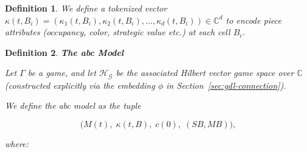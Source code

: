 \documentclass[11pt,a4paper]{article}
\theoremstyle{plain}
\newtheorem{definition}{Definition}[section]
\theoremstyle{definition}
\begin{document}
\vspace{0.5em}

\begin{definition}

\vspace{0.5em}

We define a \emph{tokenized vector} $\kappa(t,B_i) = (\kappa_1(t,B_i), \kappa_2(t,B_i), \ldots, \kappa_d(t,B_i)) \in \mathbb{C}^d$ to encode piece attributes (occupancy, color, strategic value etc.) at each cell $B_i$.

\vspace{0.5em}

\end{definition}

\vspace{0.5em}

\begin{definition}\textbf{The \emph{abc} Model}
\label{def:abc-model}

\vspace{0.5em}

Let \(\Gamma\) be a game, and let \(\mathcal{H}_\mathcal{G}\) be the associated Hilbert vector game space over \(\mathbb{C}\) (constructed explicitly via the embedding \(\phi\) in Section~\ref{sec:gdl-connection}).

\vspace{0.5em}

We define the \emph{abc} model as the tuple

\vspace{0.5em}

\[
\bigl(M(t),\; \kappa(t,B),\; c(0),\; (SB, MB)\bigr),
\]

\vspace{0.5em}

where:

\vspace{0.5em}


\end{definition}
\end{document}
